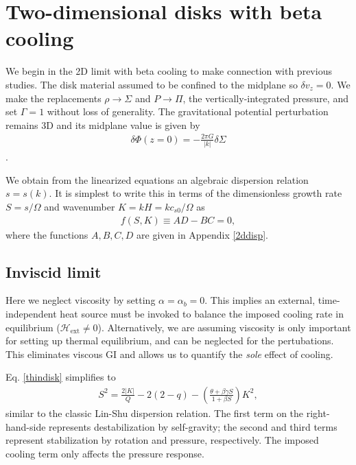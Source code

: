 \section{Two-dimensional disks with beta cooling}\label{result_2d}
We begin in the 2D limit with beta cooling  to make connection 
with previous studies. The disk
material assumed to be confined to the midplane so $\delta v_z=0$. 
We make the replacements 
$\rho \to \Sigma$ and $P\to\Pi$, the vertically-integrated
pressure, and set $\Gamma=1$ without loss of generality. 
The gravitational potential perturbation remains 3D and its midplane
value is given by    
\begin{align}
  \delta \Phi(z=0) = -\frac{2 \pi G}{|k|}\delta\Sigma
\end{align}
\citep{shu70}.
 
We obtain from the linearized equations 
an algebraic dispersion relation $s = s(k)$. It is simplest
to write this  
in terms of the dimensionless growth rate $S = s/\Omega$ and
wavenumber $K=kH = k c_{s0}/\Omega$ as
\begin{align}\label{thindisk}
  f(S,K)\equiv AD - BC = 0,   
\end{align}
where the functions $A,B,C,D$ are given in Appendix \ref{2ddisp}. 

\subsection{Inviscid limit}\label{2d_inviscid}
Here we neglect viscosity by setting 
$\alpha = \alpha_b = 0$. This implies an external,
time-independent heat source must be invoked to balance the imposed
cooling rate in equilibrium ($\mathcal{H}_\mathrm{ext}\neq 0$). Alternatively, we are assuming 
viscosity is only important for setting up thermal equilibrium, and
can be neglected for the pertubations. This eliminates viscous GI and 
allows us to quantify the \emph{sole} effect of cooling.   

Eq. \ref{thindisk} simplifies to  
\begin{align}\label{inviscid}
  S^2 = \frac{2|K|}{Q} - 2(2-q) - \left(\frac{\theta + \beta \gamma
    S}{1+\beta S}\right)K^2, 
\end{align}
similar to the classic Lin-Shu dispersion relation. The first term on
the right-hand-side represents destabilization by self-gravity; 
the second and third terms represent stabilization by rotation and
pressure, respectively. The imposed cooling term only affects the
pressure response. 

